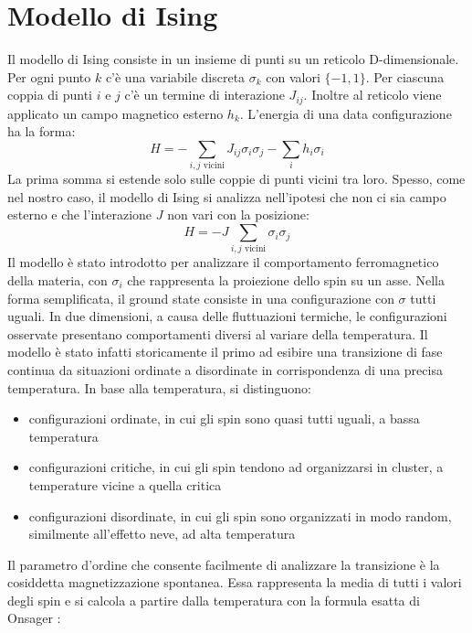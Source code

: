 \documentclass[Lau, noexaminfo, oneside]{sapthesis} %
\begin{document}
\chapter{Modello di Ising}
Il modello di Ising consiste in un insieme di punti su un reticolo D-dimensionale. Per ogni punto $k$ c'è una variabile discreta $\sigma_k$ con valori $\lbrace-1, 1\rbrace$. Per ciascuna coppia di punti $i$ e $j$ c'è un termine di interazione $J_{ij}$. Inoltre al reticolo viene applicato un campo magnetico esterno $h_{k}$. L'energia di una data configurazione ha la forma:
\begin{equation}
H = - \sum_{i,j \text{ vicini}} J_{ij} \sigma_i \sigma_j - \sum_i h_i \sigma_i 
\label{isingcompleto}
\end{equation}
La prima somma si estende solo sulle coppie di punti vicini tra loro. Spesso, come nel nostro caso, il modello di Ising si analizza nell'ipotesi che non ci sia campo esterno e che l'interazione $J$ non vari con la posizione:
\begin{equation}
H = -J \sum_{i,j \text{ vicini}}  \sigma_i \sigma_j
\end{equation}
Il modello è stato introdotto per analizzare il comportamento ferromagnetico della materia, con $\sigma_{i}$ che rappresenta la proiezione dello spin su un asse. Nella forma semplificata, il ground state consiste in una configurazione con $\sigma$ tutti uguali. In due dimensioni, a causa delle fluttuazioni termiche, le configurazioni osservate presentano comportamenti diversi al variare della temperatura. Il modello è stato infatti storicamente il primo ad esibire una transizione di fase continua da situazioni ordinate a disordinate in corrispondenza di una precisa temperatura.
In base alla temperatura, si distinguono:
\begin{itemize}
\item configurazioni ordinate, in cui gli spin sono quasi tutti uguali, a bassa temperatura
\item configurazioni critiche, in cui gli spin tendono ad organizzarsi in cluster, a temperature vicine a quella critica
\item configurazioni disordinate, in cui gli spin sono organizzati in modo random, similmente all'effetto neve, ad alta temperatura
\end{itemize}
Il parametro d'ordine che consente facilmente di analizzare la transizione è la cosiddetta magnetizzazione spontanea. Essa rappresenta la media di tutti i valori degli spin e si calcola a partire dalla temperatura con la formula esatta di Onsager \cite{onsager}:
\end{document}

